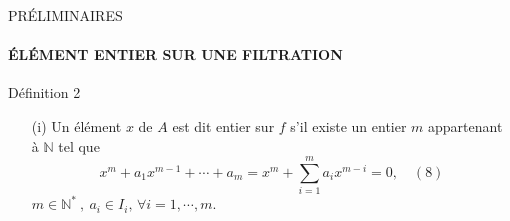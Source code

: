 \documentclass[11pt,a4paper]{beamer}
\begin{document}
%	
	\begin{frame}{PRÉLIMINAIRES}
		\framesubtitle{ÉLÉMENT ENTIER SUR UNE FILTRATION}
		\begin{block}{Définition 2}
			\begin{enumerate}
				\item[(i)] Un élément $x$ de $A$ est dit entier sur $f$ s'il existe un entier $m $ appartenant à $ \mathbb{N}$ tel que
				\[ x^m + a_1 x^{m-1} + \cdots + a_m = x^m + \sum_{i=1}^{m} a_i x^{m-i} = 0, \quad (8) \]
				 $m \in \mathbb{N^*} \ , \ a_i \in I_i,\,\forall i=1, \cdots ,m.$
			\end{enumerate}
		\end{block}
	\end{frame}
	
\end{document}
